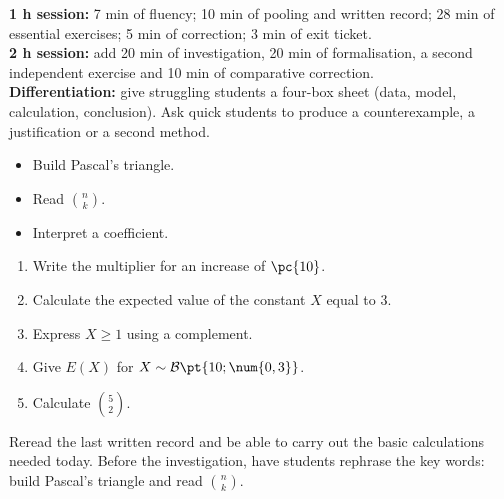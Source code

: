 \ifmxteacher
\begin{method}
\textbf{1 h session:} 7 min of fluency; 10 min of pooling and written record; 28 min of essential exercises; 5 min of correction; 3 min of exit ticket.\\
\textbf{2 h session:} add 20 min of investigation, 20 min of formalisation, a second independent exercise and 10 min of comparative correction.\\
\textbf{Differentiation:} give struggling students a four-box sheet (data, model, calculation, conclusion). Ask quick students to produce a counterexample, a justification or a second method.
\end{method}
\fi
{}
\begin{objectives}\begin{itemize}\item Build Pascal's triangle.\item Read $\binom nk$.\item Interpret a coefficient.\end{itemize}\end{objectives}
\begin{fluency}\begin{enumerate}\item Write the multiplier for an increase of $\pc{10}$. \item Calculate the expected value of the constant $X$ equal to $3$. \item Express $X\geq1$ using a complement. \item Give $E(X)$ for $X\sim\mathcal B\pt{10;\num{0,3}}$. \item Calculate $\binom52$. \end{enumerate}\end{fluency}
\begin{prerequisites}Reread the last written record and be able to carry out the basic calculations needed today. Before the investigation, have students rephrase the key words: build Pascal's triangle and read $\binom nk$.\end{prerequisites}

